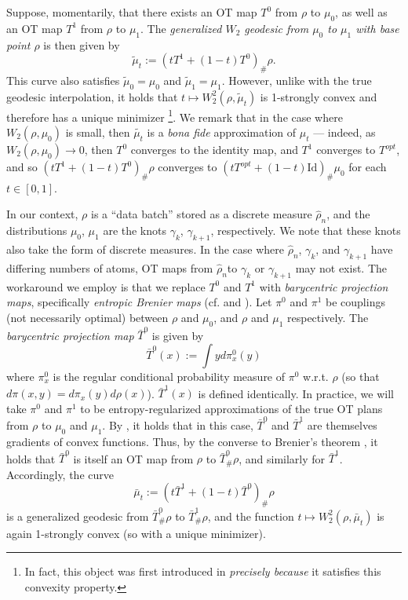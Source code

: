 \documentclass[aos, preprint]{imsart}
\theoremstyle{plain}
\theoremstyle{remark}
\begin{document}
\begin{appendix}
Suppose, momentarily, that there exists an OT map $T^{0}$ from $\rho$
to $\mu_{0}$, as well as an OT map $T^{1}$ from $\rho$ to $\mu_{1}$.
The \emph{generalized $W_{2}$ geodesic from $\mu_{0}$ to $\mu_{1}$
with base point $\rho$} is then given by
\[
\tilde{\mu}_{t}:=(tT^{1}+(1-t)T^{0})_{\#}\rho.
\]
This curve also satisfies $\tilde{\mu}_{0}=\mu_{0}$ and $\tilde{\mu}_{1}=\mu_{1}$.
However, unlike with the true geodesic interpolation, it holds that
$t\mapsto W_{2}^{2}(\rho,\tilde{\mu}_{t})$ is 1-strongly convex \cite[Lemma 9.2.1]{ambrosio2008gradient}  and therefore has a unique minimizer \footnote{In fact, this
object was first introduced in \cite{ambrosio2008gradient} \emph{precisely because}
it satisfies this convexity property.}. We remark that in the case
where $W_{2}(\rho,\mu_{0})$ is small, then $\tilde{\mu_{t}}$ is
a \emph{bona fide} approximation of $\mu_{t}$ --- indeed, as $W_{2}(\rho,\mu_{0})\rightarrow0$,
then $T^{0}$ converges to the identity map, and $T^1$ converges to $T^{opt}$, and so $(tT^{1}+(1-t)T^{0})_{\#}\rho$
converges to $(tT^{opt}+(1-t)\text{Id})_{\#}\mu_0$ for each
$t\in[0,1]$.

In our context, $\rho$ is a ``data batch'' stored as a discrete
measure $\hat{\rho}_{n}$, and the distributions $\mu_{0}$, $\mu_{1}$ are the knots
$\gamma_{k}$, $\gamma_{k+1}$, respectively. We note that these knots also take the form of discrete measures. In the case where $\hat{\rho}_{n}$, $\gamma_{k}$, and $\gamma_{k+1}$
have differing numbers of atoms, OT maps from $\hat{\rho}_{n}$to
$\gamma_{k}$ or $\gamma_{k+1}$ may not exist. The workaround we
employ is that we replace $T^{0}$ and $T^{1}$ with \emph{barycentric
projection maps}, specifically \emph{entropic Brenier maps} (cf. \cite[Definition 5.4.2]{ambrosio2008gradient}  and \cite{divol2025tight, pooladian2021entropic, rigollet2025sample}). Let $\pi^{0}$
and $\pi^{1}$ be couplings (not necessarily optimal) between $\rho$
and $\mu_{0}$, and $\rho$ and $\mu_{1}$ respectively. The \emph{barycentric
projection map} $\bar{T}^{0}$ is given by
\[
\bar{T}^{0}(x):=\int yd\pi_{x}^{0}(y)
\]
where $\pi_{x}^{0}$ is the regular conditional probability measure
of $\pi^{0}$ w.r.t. $\rho$ (so that $d\pi(x,y)=d\pi_{x}(y)d\rho(x)$).
$\bar{T}^{1}(x)$ is defined identically. In practice, we will take
$\pi^{0}$ and $\pi^{1}$ to be entropy-regularized approximations
of the true OT plans from $\rho$ to $\mu_{0}$ and $\mu_{1}$. By \cite[Remark 2]{pooladian2021entropic}, it holds that in this case,
$\bar{T}^{0}$ and $\bar{T}^{1}$ are themselves gradients of convex
functions. Thus, by the converse to Brenier's theorem \cite[Theorem 1.48]{santambrogio2015optimal}, it holds that $\bar{T}^{0}$ is itself an OT map from $\rho$
to $\bar{T}_{\#}^{0}\rho$, and similarly for $\bar{T}^{1}$. Accordingly,
the curve
\[
\bar{\mu}_{t}:=(t\bar{T}^{1}+(1-t)\bar{T}^{0})_{\#}\rho
\]
is a generalized geodesic from $\bar{T}_{\#}^{0}\rho$ to $\bar{T}_{\#}^{1}\rho$,
and the function $t\mapsto W_{2}^{2}(\rho,\bar{\mu}_{t})$
is again 1-strongly convex (so with a unique minimizer).


\end{appendix}
\end{document}

